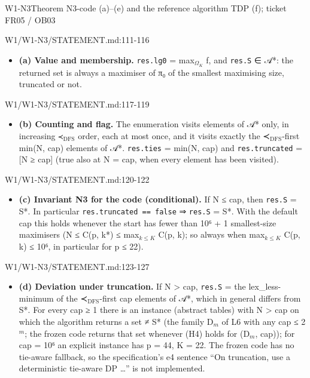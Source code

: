 \begin{card}{W1-N3}{Theorem N3-code (a)–(e) and the reference algorithm TDP (f); ticket FR05 / OB03}
\begin{stmt}{W1/W1-N3/STATEMENT.md:111-116}
\begin{itemize}
\item \textbf{(a) Value and membership.} \texttt{res.lg0} = max$_{\Omega_K}$ f, and \texttt{res.S} ∈ 𝒜*: the returned set is always a maximiser of π₀
of the smallest maximising size, truncated or not.
\end{itemize}
\end{stmt}
\begin{stmt}{W1/W1-N3/STATEMENT.md:117-119}
\begin{itemize}
\item \textbf{(b) Counting and flag.} The enumeration visits elements of 𝒜* only, in increasing ≺$_{\mathrm{DFS}}$ order, each at most once,
and it visits exactly the ≺$_{\mathrm{DFS}}$-first min(N, cap) elements of 𝒜*. \texttt{res.ties} = min(N, cap) and
\texttt{res.truncated} = [N ≥ cap] (true also at N = cap, when every element has been visited).
\end{itemize}
\end{stmt}
\begin{stmt}{W1/W1-N3/STATEMENT.md:120-122}
\begin{itemize}
\item \textbf{(c) Invariant N3 for the code (conditional).} If N ≤ cap, then \texttt{res.S} = S*. In particular \texttt{res.truncated == false}
⇒ \texttt{res.S} = S*. With the default cap this holds whenever the start has fewer than 10⁶ + 1 smallest-size maximisers
(N ≤ C(p, k*) ≤ max$_{k\le K}$ C(p, k); so always when max$_{k\le K}$ C(p, k) ≤ 10⁶, in particular for p ≤ 22).
\end{itemize}
\end{stmt}
\begin{stmt}{W1/W1-N3/STATEMENT.md:123-127}
\begin{itemize}
\item \textbf{(d) Deviation under truncation.} If N > cap, \texttt{res.S} = the lex\_less-minimum of the ≺$_{\mathrm{DFS}}$-first cap elements of 𝒜*,
which in general differs from S*. For every cap ≥ 1 there is an instance (abstract tables) with N > cap on which the
algorithm returns a set ≠ S* (the family D$_{m}$ of L6 with any cap ≤ 2$^{m}$; the frozen code returns that set whenever (H4)
holds for (D$_{m}$, cap)); for cap = 10⁶ an explicit instance has p = 44, K = 22. The frozen code has no tie-aware fallback, so the
specification's e4 sentence ``On truncation, use a deterministic tie-aware DP …'' is not implemented.
\end{itemize}
\end{stmt}

\end{card}
